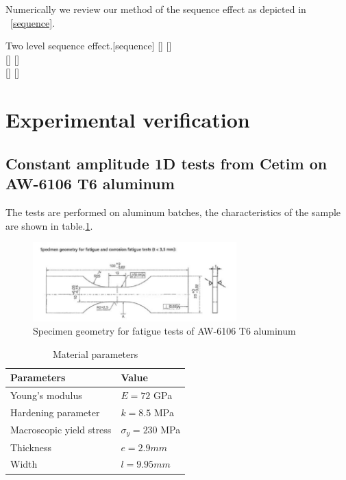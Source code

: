 \documentclass[3p,times,number,review]{elsarticle}
\newcommand{\figref}[1]{\figurename~\ref{#1}}
\begin{document}
Numerically we review our method of the sequence effect as depicted in \figref{sequence}.
\begin{Figure}[h!]{Two level sequence effect.}[sequence]
[]
[]
\\
[]
[]
\\
[]
[]
\label{sequence}
\end{Figure}


\clearpage
\section{Experimental verification}
\subsection{Constant amplitude 1D tests from Cetim on AW-6106 T6 aluminum}

The tests are performed on aluminum batches, the characteristics of the sample are shown in table.\ref{tab:cetim}.
\begin{figure}[!h]
	\centering
	\includegraphics[width=0.7\textwidth]{figures//aluminum_cetim.png} 
	\caption{Specimen geometry for fatigue tests of AW-6106 T6 aluminum}
	\label{fig:aluminum}
\end{figure}
\begin{table}[!h]
	\centering
	\begin{tabular}{ll}
		\hline
		\textbf{Parameters}                                         & \textbf{Value}                    \\ \hline
		Young's modulus                                             & $E=72$ GPa                       \\
		Hardening parameter                                         &  $k=8.5$ MPa \\
		Macroscopic yield stress                                    & $\sigma_y=230$ MPa              \\
		Thickness & $e=2.9mm$                        \\
		Width		 & $l= 9.95mm$                        \\ \hline
	\end{tabular}
	\caption{Material parameters}
	\label{tab:cetim}
\end{table}
\end{document}
